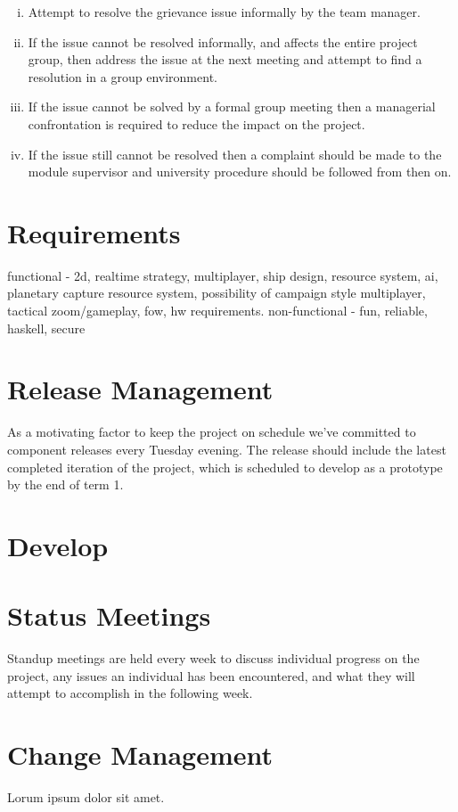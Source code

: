 \begin{enumerate}[i)]
	\item{Attempt to resolve the grievance issue informally by the team manager.}
	\item{If the issue cannot be resolved informally, and affects the entire project group, then address the issue at the next meeting and attempt to find a resolution in a group environment.}
	\item{If the issue cannot be solved by a formal group meeting then a managerial confrontation is required to reduce the impact on the project.}
	\item{If the issue still cannot be resolved then a complaint should be made to the module supervisor and university procedure should be followed from then on.}
\end{enumerate}


\section{Requirements}
functional - 2d, realtime strategy, multiplayer, ship design, resource system, ai, planetary capture resource system, possibility of campaign style multiplayer, tactical zoom/gameplay, fow, hw requirements.
non-functional - fun, reliable, haskell, secure  

\section{Release Management}
As a motivating factor to keep the project on schedule we've committed to component releases every Tuesday evening. The release should include the latest completed iteration of the project, which is scheduled to develop as a prototype by the end of term 1.

\section{Develop}
\section{Status Meetings}
Standup meetings are held every week to discuss individual progress on the project, any issues an individual has been encountered, and what they will attempt to accomplish in the following week.
\section{Change Management}

Lorum ipsum dolor sit amet.